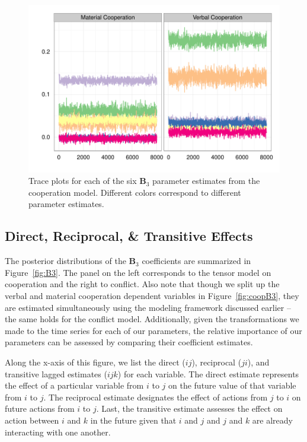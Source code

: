 \documentclass[3p,times,twocolumn,authoryear,12pt]{elsarticle}
\newcommand{\bl}[1]{{\mathbf #1}}
\begin{document}
\begin{figure}[ht]
	\centering
			\includegraphics[width=.45\textwidth]{Coop_trace}
	\caption{Trace plots for each of the six $\bl B_3$ parameter estimates from the cooperation model. Different colors correspond to different parameter estimates.}
	\label{fig:trace}
\end{figure}

\subsection{Direct, Reciprocal, \& Transitive Effects}

The posterior distributions of the $\bl B_3$ coefficients are summarized in Figure~\ref{fig:B3}. The panel on the left corresponds to the tensor model on cooperation and the right to conflict. Also note that though we split up the verbal and material cooperation dependent variables in Figure~\ref{fig:coopB3}, they are estimated simultaneously using the modeling framework discussed earlier -- the same holds for the conflict model. Additionally, given the transformations we made to the time series for each of our parameters, the relative importance of our parameters can be assessed by comparing their coefficient estimates.

Along the x-axis of this figure, we list the direct ($ij$), reciprocal ($ji$), and transitive lagged estimates ($ijk$) for each variable. The direct estimate represents the effect of a particular variable from $i$ to $j$ on the future value of that variable from $i$ to $j$. The reciprocal estimate designates the effect of actions from $j$ to $i$ on future actions from $i$ to $j$. Last, the transitive estimate assesses the effect on action between $i$ and $k$ in the future given that $i$ and $j$ and $j$ and $k$ are already interacting with one another.
\end{document}
